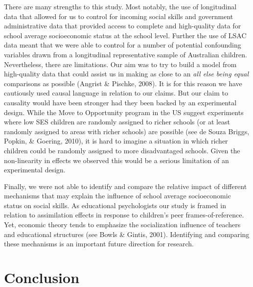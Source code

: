 \documentclass[
  english,
  man]{apa6}
\begin{document}
There are many strengths to this study. Most notably, the use of longitudinal data that allowed for us to control for incoming social skills and government administrative data that provided access to complete and high-quality data for school average socioeconomic status at the school level. Further the use of LSAC data meant that we were able to control for a number of potential confounding variables drawn from a longitudinal representative sample of Australian children. Nevertheless, there are limitations. Our aim was to try to build a model from high-quality data that could assist us in making as close to an \emph{all else being equal} comparisons as possible (Angrist \& Pischke, 2008). It is for this reason we have cautiously used causal language in relation to our claims. But our claim to causality would have been stronger had they been backed by an experimental design. While the Move to Opportunity program in the US suggest experiments where low SES children are randomly assigned to richer schools (or at least randomly assigned to areas with richer schools) are possible (see de Souza Briggs, Popkin, \& Goering, 2010), it is hard to imagine a situation in which richer children could be randomly assigned to more disadvantaged schools. Given the non-linearity in effects we observed this would be a serious limitation of an experimental design.

Finally, we were not able to identify and compare the relative impact of different mechanisms that may explain the influence of school average socioeconomic status on social skills. As educational psychologists our study is framed in relation to assimilation effects in response to children's peer frames-of-reference. Yet, economic theory tends to emphasize the socialization influence of teachers and educational structures (see Bowls \& Gintis, 2001). Identifying and comparing these mechanisms is an important future direction for research.

\hypertarget{conclusion}{%
\section{Conclusion}\label{conclusion}}
\end{document}
